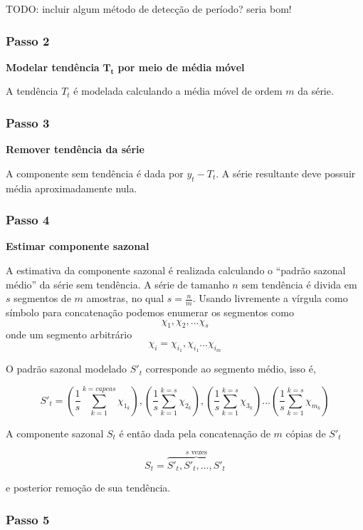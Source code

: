 TODO: incluir algum método de detecção de período? seria bom!

\subsubsection{Passo 2}

\textbf{Modelar tendência }$\mathbf{T_t}$\textbf{ por meio de média móvel}

A tendência $T_t$ é modelada calculando a média móvel de ordem $m$ da série.

\subsubsection{Passo 3}

\textbf{Remover tendência da série}

A componente sem tendência é dada por $y_t - T_t$. A série resultante deve
possuir média aproximadamente nula.

\subsubsection{Passo 4}

\textbf{Estimar componente sazonal}

A estimativa da componente sazonal é realizada calculando o ``padrão sazonal
médio'' da série sem tendência. A série de tamanho $n$ sem tendência é divida
em $s$ segmentos de $m$ amostras, no qual $s = \frac{n}{m}$. Usando livremente
a vírgula como símbolo para concatenação podemos enumerar os segmentos como
$$\chi_1, \chi_2, ... \chi_s$$ onde um segmento arbitrário $$\chi_i =
\chi_{i_{1}}, \chi_{i_{1}} ... \chi_{i_{m}}$$

O padrão sazonal modelado $S'_t$ corresponde ao segmento médio, isso é,

$$ S'_t = \left(\frac{1}{s} \sum_{k=1}^{k=capcas} \chi_{1_{k}}\right), \left(\frac{1}{s} \sum_{k=1}^{k=s} \chi_{2_{k}}\right), \left(\frac{1}{s} \sum_{k=1}^{k=s} \chi_{3_{k}}\right) \hdots \left(\frac{1}{s} \sum_{k=1}^{k=s} \chi_{m_{k}}\right)$$

A componente sazonal $S_t$ é então dada pela concatenação de $m$ cópias de
$S'_t$

$$ S_t = \overbrace{S'_t, S'_t, \hdots, S'_t}^{s\text{ vezes}} $$

e posterior remoção de sua tendência.

\subsubsection{Passo 5}

